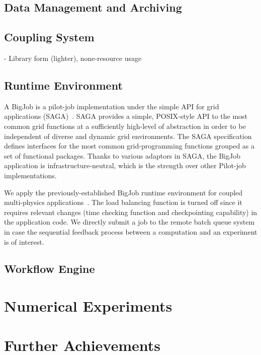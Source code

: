 \documentclass[10pt,conference]{IEEEtran}
\begin{document}
\subsection{Data Management and Archiving}

\subsection{Coupling System}
- Library form (lighter), none-resource usage

\subsection{Runtime Environment}
A BigJob is a pilot-job implementation under the simple API for grid applications 
(SAGA)~\cite{saga_url}. SAGA provides a simple, POSIX-style API to the most common 
grid functions at a sufficiently high-level of abstraction in order to 
be independent of diverse and dynamic grid environments. The SAGA speciﬁcation 
defines interfaces for the most common grid-programming functions grouped as 
a set of functional packages. Thanks to various adaptors in SAGA, the BigJob
application is infrastructure-neutral, which is the strength over other
Pilot-job implementations.

We apply the previously-established BigJob runtime environment for coupled
multi-physics applications~\cite{CCGrid_Hybrid}. The load balancing function
is turned off since it requires relevant changes (time checking function and
checkpointing capability) in the application code.
We directly submit a job to the remote batch queue system in case the
sequential feedback process between a computation and an experiment is
of interest.

\subsection{Workflow Engine}

\section{Numerical Experiments}
\label{sec:experiment}

\section{Further Achievements}
\label{sec:futureworks}
\end{document}
